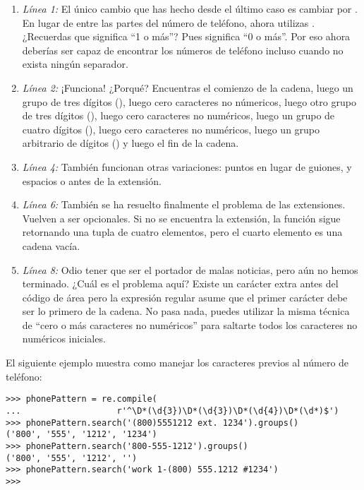 \begin{enumerate}

\item \emph{Línea 1:} El único cambio que has hecho desde el último caso es cambiar \codigo{+} por \codigo{*}. En lugar de  entre las partes del número de teléfono, ahora utilizas . ¿Recuerdas que \codigo{+} significa ``1 o más''? Pues \codigo{*} significa ``0 o más''. Por eso ahora deberías ser capaz de encontrar los números de teléfono incluso cuando no exista ningún separador.

\item \emph{Línea 2:} ¡Funciona! ¿Porqué? Encuentras el comienzo de la cadena, luego un grupo de tres dígitos (), luego cero caracteres no númericos, luego otro grupo de tres dígitos (), luego cero caracteres no numéricos, luego un grupo de cuatro dígitos (), luego cero caracteres no numéricos, luego un grupo arbitrario de dígitos () y luego el fin de la cadena.

\item \emph{Línea 4:} También funcionan otras variaciones: puntos en lugar de guiones, y espacios o  antes de la extensión.

\item \emph{Línea 6:} También se ha resuelto finalmente el problema de las extensiones. Vuelven a ser opcionales. Si no se encuentra la extensión, la función  sigue retornando una tupla de cuatro elementos, pero el cuarto elemento es una cadena vacía.

\item \emph{Línea 8:} Odio tener que ser el portador de malas noticias, pero aún no hemos terminado. ¿Cuál es el problema aquí? Existe un carácter extra antes del código de área pero la expresión regular asume que el primer carácter debe ser lo primero de la cadena. No pasa nada, puedes utilizar la misma técnica de ``cero o más caracteres no numéricos'' para saltarte todos los caracteres no numéricos iniciales. 

\end{enumerate}
 
El siguiente ejemplo muestra como manejar los caracteres previos al número de teléfono:

\noindent\begin{minipage}{\textwidth}
\begin{lstlisting}[mathescape=False]
>>> phonePattern = re.compile(
...                   r'^\D*(\d{3})\D*(\d{3})\D*(\d{4})\D*(\d*)$')
>>> phonePattern.search('(800)5551212 ext. 1234').groups()
('800', '555', '1212', '1234')
>>> phonePattern.search('800-555-1212').groups()
('800', '555', '1212', '')
>>> phonePattern.search('work 1-(800) 555.1212 #1234')
>>> 
\end{lstlisting}
\end{minipage}

